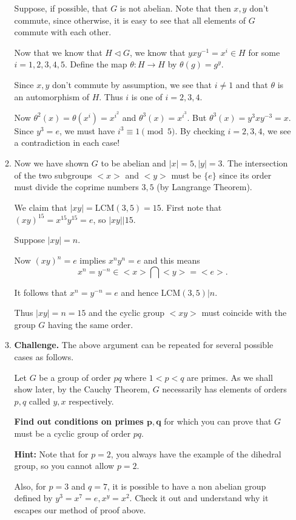 \documentclass[12pt]{article}
\begin{document}
\begin{enumerate}
\begin{enumerate}
Suppose, if possible, that $G$ is not abelian.
Note that then $x,y$ don't commute, since otherwise, it is easy to see
that all elements of $G$ commute with each other.

Now that we know that $H \vartriangleleft G$, we know that
$yxy^{-1}=x^i\in H$ for some $i=1,2,3,4,5$. Define the map $\theta:H
\rightarrow H$ by $\theta(g)=g^y$. 

Since $x,y$ don't commute by assumption, we see that $i\neq 1$ and that 
$\theta$ is an
automorphism of $H$. Thus $i$ is one of $i=2,3,4$.

Now $\theta^2(x)=\theta(x^i) = x^{i^2}$ and $\theta^3(x)=x^{i^3}$. 
But $\theta^3(x) = y^3xy^{-3}=x$. Since $y^3=e$, we must have $i^3 \equiv 1
\pmod{5}$. By checking $i=2,3,4$, we see a contradiction in each case!

\item Now we have shown $G$ to be abelian and $|x|=5,|y|=3$.
The intersection of the two subgroups $<x>$ and $<y>$ must be $\{e\}$
since its order must divide the coprime numbers $3,5$ (by Langrange
Theorem).

We claim that $|xy|=\mbox{LCM}(3,5)=15$.
First note that $(xy)^{15} = x^{15}y^{15} = e$, so $|xy| | 15$.

Suppose $|xy|=n$.

Now $(xy)^n=e$ implies $x^ny^n=e$ and this means 
$$x^n = y^{-n} \in
<x>\bigcap <y> = <e>.$$

It follows that $x^n=y^{-n}=e$ and hence $\mbox{LCM}(3,5)|n$.

Thus $|xy|=n=15$ and the cyclic group $<xy>$ must coincide with the
group $G$ having the same order.

\item {\bf Challenge.}
The above argument can be repeated for several possible cases as
follows.

Let $G$ be a group of order $pq$ where $1<p<q$ are primes.
As we shall show later, by the Cauchy Theorem,  $G$ necessarily has elements of orders $p,q$
called $y,x$ respectively.
 
{\bf Find out conditions on primes $\mathbf{p,q}$} for which you can prove that $G$ 
must be a cyclic group of order $pq$.

{\bf Hint:} Note that for $p=2$, you always have the example of the
dihedral group, so you cannot allow $p=2$.

Also, for $p=3$ and $q=7$, it is possible to have a non abelian group
defined by $y^3=x^7=e,x^y = x^{2}$. Check it out and understand why it
escapes our method of proof above.


\end{enumerate}
\end{enumerate}
\end{document}
